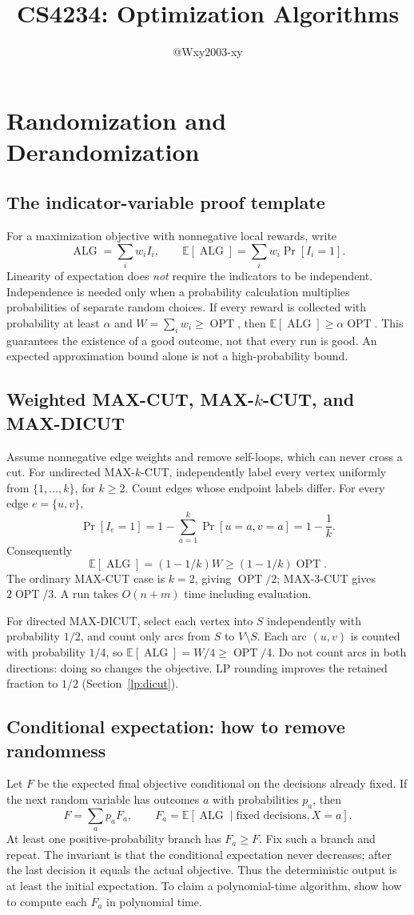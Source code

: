 \documentclass[10pt]{article}
\title{CS4234: Optimization Algorithms}
\author{@Wxy2003-xy}
\date{}
\theoremstyle{definition}
\newcommand{\OPT}{\operatorname{OPT}}
\newcommand{\ALG}{\operatorname{ALG}}
\begin{document}
\section{Randomization and Derandomization}\label{ra:main}

\subsection{The indicator-variable proof template}
For a maximization objective with nonnegative local rewards, write
\[
  \ALG=\sum_i w_i I_i,\qquad
  \mathbb E[\ALG]=\sum_i w_i\Pr[I_i=1].
\]
Linearity of expectation does \emph{not} require the indicators to be
independent. Independence is needed only when a probability calculation
multiplies probabilities of separate random choices. If every reward is
collected with probability at least $\alpha$ and
$W=\sum_iw_i\ge\OPT$, then $\mathbb E[\ALG]\ge\alpha\OPT$.
This guarantees the existence of a good outcome, not that every run is good.
An expected approximation bound alone is not a high-probability bound.

\subsection{Weighted MAX-CUT, MAX-$k$-CUT, and MAX-DICUT}
Assume nonnegative edge weights and remove self-loops, which can never cross
a cut. For undirected MAX-$k$-CUT, independently label every vertex uniformly
from $\{1,\ldots,k\}$, for $k\ge2$. Count edges whose endpoint labels differ.
For every edge $e=\{u,v\}$,
\[
  \Pr[I_e=1]=1-\sum_{a=1}^k\Pr[u=a,v=a]=1-\frac1k.
\]
Consequently
\[
  \mathbb E[\ALG]=(1-1/k)W\ge(1-1/k)\OPT.
\]
The ordinary MAX-CUT case is $k=2$, giving $\OPT/2$; MAX-3-CUT gives
$2\OPT/3$. A run takes $O(n+m)$ time including evaluation.

For directed MAX-DICUT, select each vertex into $S$ independently with
probability $1/2$, and count only arcs from $S$ to $V\setminus S$.
Each arc $(u,v)$ is counted with probability $1/4$, so
$\mathbb E[\ALG]=W/4\ge\OPT/4$.
Do not count arcs in both directions: doing so changes the objective.
LP rounding improves the retained fraction to $1/2$
(Section~\ref{lp:dicut}).

\subsection{Conditional expectation: how to remove randomness}\label{ra:conditional}
Let $F$ be the expected final objective conditional on the decisions already
fixed. If the next random variable has outcomes $a$ with probabilities $p_a$,
then
\[
  F=\sum_a p_a F_a,\qquad
  F_a=\mathbb E[\ALG\mid\text{fixed decisions},X=a].
\]
At least one positive-probability branch has $F_a\ge F$. Fix such a branch and
repeat. The invariant is that the conditional expectation never decreases;
after the last decision it equals the actual objective. Thus the deterministic
output is at least the initial expectation. To claim a polynomial-time
algorithm, show how to compute each $F_a$ in polynomial time.
\end{document}

